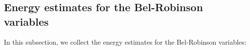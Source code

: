 \documentclass[11pt,leqno,textwidth=10cm]{amsart}
\numberwithin{equation}{section}
\theoremstyle{definition}
\theoremstyle{plain}
\newtheorem{corollary}[definition]{Corollary}
\newcommand{\1}{\mathbbm{1}}
\newcommand{\E}{\mathcal{E}}
\renewcommand{\epsilon}{\varepsilon}
\begin{document}


\subsection{Energy estimates for the Bel-Robinson variables}\label{subsec:en-BR}

In this subsection, we collect the energy estimates for the Bel-Robinson variables:
\end{document}

